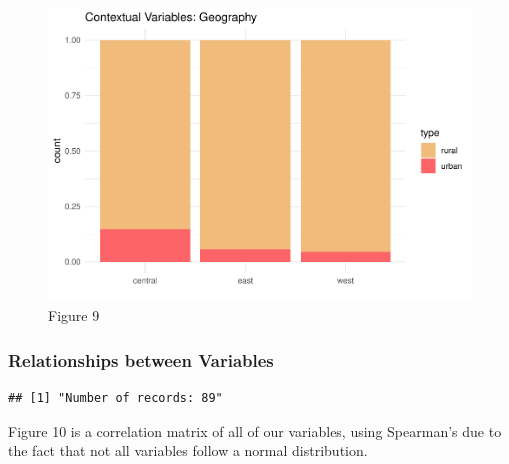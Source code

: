 \documentclass[]{article}
\newenvironment{Shaded}{\begin{snugshade}}{\end{snugshade}}
\newcommand{\CommentTok}[1]{\textcolor[rgb]{0.56,0.35,0.01}{\textit{#1}}}
\newcommand{\DecValTok}[1]{\textcolor[rgb]{0.00,0.00,0.81}{#1}}
\newcommand{\KeywordTok}[1]{\textcolor[rgb]{0.13,0.29,0.53}{\textbf{#1}}}
\newcommand{\NormalTok}[1]{#1}
\newcommand{\OperatorTok}[1]{\textcolor[rgb]{0.81,0.36,0.00}{\textbf{#1}}}
\newcommand{\StringTok}[1]{\textcolor[rgb]{0.31,0.60,0.02}{#1}}
\begin{document}
\begin{figure}

{\centering \includegraphics{lab_3_final_files/figure-latex/unnamed-chunk-29-1} 

}

\caption{Figure 9}\label{fig:unnamed-chunk-29}
\end{figure}

\hypertarget{relationships-between-variables}{%
\subsubsection{Relationships between
Variables}\label{relationships-between-variables}}

\begin{Shaded}
\end{Shaded}

\begin{verbatim}
## [1] "Number of records: 89"
\end{verbatim}

Figure 10 is a correlation matrix of all of our variables, using
Spearman's due to the fact that not all variables follow a normal
distribution.
\end{document}

